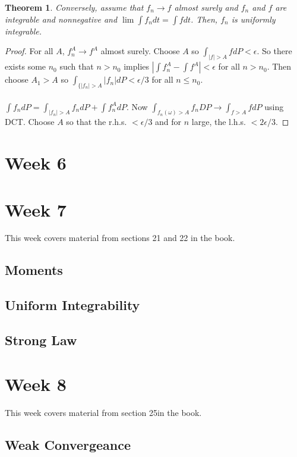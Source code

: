 \documentclass[12pt]{article}
\newtheorem{theorem}{Theorem}
\begin{document}
\begin{theorem}
Conversely, assume that $f_n \to f$ almost surely and $f_n$ and $f$ are integrable and nonnegative and $\lim \int f_n dt = \int f dt$.  Then, $f_n$ is uniformly integrable.
\end{theorem}
\begin{proof}
For all $A$, $f_n^A \to f^A$ almost surely.  Choose $A$ so $\int_{|f| > A} f dP  < \epsilon$.  So there exists some $n_0$ such that $n > n_0$ implies $|\int f_n^A - \int f^A | < \epsilon$ for all $n > n_0$.  Then choose $A_1 > A$ so $\int_{\{|f_n| > A} |f_n| dP < \epsilon / 3$ for all $n \le n_0$.
\\ \\
$\int f_n dP = \int_{|f_n| > A} f_n dP + \int f_n^A dP$.  Now $\int_{f_n(\omega) > A} f_n DP \rightarrow \int_{f > A} f dP$ using DCT.  Choose $A$ so that the r.h.s. $< \epsilon/3$ and for $n$ large, the l.h.s. $< 2 \epsilon / 3$.
\end{proof}






\section{Week 6}


\section{Week 7}
This week covers material from sections 21 and 22 in the book.

\subsection{Moments}

\subsection{Uniform Integrability}

\subsection{Strong Law}


\section{Week 8}
This week covers material from section 25in the book.

\subsection{Weak Convergeance}
\end{document}
